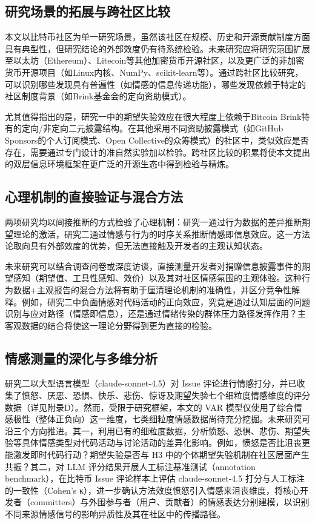 \documentclass[
    type = master, %
    degree = professional,        %
    decl-page,  %
    twoside,                %
    fontset = fandol %
  ]{njuthesis}
\begin{document}
\subsection{研究场景的拓展与跨社区比较}

本文以比特币社区为单一研究场景，虽然该社区在规模、历史和开源贡献制度方面具有典型性，但研究结论的外部效度仍有待系统检验。未来研究应将研究范围扩展至以太坊（Ethereum）、Litecoin等其他加密货币开源社区\cite{kulakowski2023sentiment}，以及更广泛的非加密货币开源项目（如Linux内核、NumPy、scikit-learn等）。通过跨社区比较研究，可以识别哪些发现具有普遍性（如情感的信息传递功能），哪些发现依赖于特定的社区制度背景（如Brink基金会的定向资助模式）。

尤其值得指出的是，研究一中的期望失验效应在很大程度上依赖于Bitcoin Brink特有的定向/非定向二元披露结构。在其他采用不同资助披露模式（如GitHub Sponsors的个人订阅模式、Open Collective的众筹模式）的社区中，类似效应是否存在，需要通过专门设计的准自然实验加以检验。跨社区比较的积累将使本文提出的双层信息环境框架在更广泛的开源生态中得到检验与精炼。

\subsection{心理机制的直接验证与混合方法}

两项研究均以间接推断的方式检验了心理机制：研究一通过行为数据的差异推断期望理论的激活，研究二通过情感与行为的时序关系推断情感即信息效应。这一方法论取向具有外部效度的优势，但无法直接触及开发者的主观认知状态。

未来研究可以结合调查问卷或深度访谈，直接测量开发者对捐赠信息披露事件的期望感知（期望值、工具性感知、效价）以及其对社区情感氛围的主观体验。这种行为数据+主观报告的混合方法将有助于厘清理论机制的准确性，并区分竞争性解释。例如，研究二中负面情感对代码活动的正向效应，究竟是通过认知层面的问题识别与应对路径（情感即信息），还是通过情绪传染的群体压力路径发挥作用？主客观数据的结合将使这一理论分野得到更为直接的检验。

\subsection{情感测量的深化与多维分析}

研究二以大型语言模型（claude-sonnet-4.5）对 Issue 评论进行情感打分，并已收集了愤怒、厌恶、恐惧、快乐、悲伤、惊讶及期望失验七个细粒度情感维度的评分数据（详见附录D）。然而，受限于研究框架，本文的 VAR 模型仅使用了综合情感极性（整体正负向）这一维度，七类细粒度情感数据尚待充分挖掘。未来研究可沿三个方向推进。其一，利用已有的细粒度数据，分析愤怒、恐惧、悲伤、期望失验等具体情感类型对代码活动与讨论活动的差异化影响。例如，愤怒是否比沮丧更能激发即时代码行动？期望失验是否与 H3 中的个体期望失验机制在社区层面产生共振？其二，对 LLM 评分结果开展人工标注基准测试（annotation benchmark），在比特币 Issue 评论样本上评估 claude-sonnet-4.5 打分与人工标注的一致性（Cohen's κ），进一步确认方法效度愤怒引入情感来沮丧维度，将核心开发者（committers）与外围参与者（用户、贡献者）的情感表达分别建模，以识别不同来源情感信号的影响异质性及其在社区中的传播路径。
\end{document}
